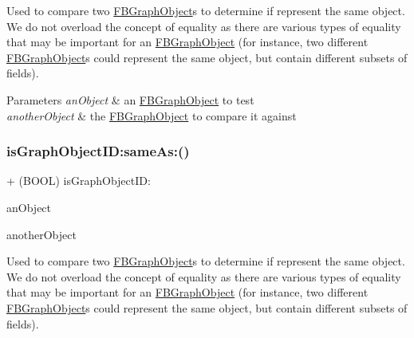 Used to compare two {\ttfamily \hyperlink{interfaceFBGraphObject}{F\+B\+Graph\+Object}}s to determine if represent the same object. We do not overload the concept of equality as there are various types of equality that may be important for an {\ttfamily \hyperlink{interfaceFBGraphObject}{F\+B\+Graph\+Object}} (for instance, two different {\ttfamily \hyperlink{interfaceFBGraphObject}{F\+B\+Graph\+Object}}s could represent the same object, but contain different subsets of fields).


\begin{DoxyParams}{Parameters}
{\em an\+Object} & an {\ttfamily \hyperlink{interfaceFBGraphObject}{F\+B\+Graph\+Object}} to test\\
\hline
{\em another\+Object} & the {\ttfamily \hyperlink{interfaceFBGraphObject}{F\+B\+Graph\+Object}} to compare it against \\
\hline
\end{DoxyParams}
\mbox{\label{interfaceFBGraphObject_a62b9fd3318de27294b10860c9a62160c}} 
\subsubsection{\texorpdfstring{is\+Graph\+Object\+I\+D\+:same\+As\+:()}{isGraphObjectID:sameAs:()}\hspace{0.1cm}{\footnotesize\ttfamily [2/5]}}
{\footnotesize\ttfamily + (B\+O\+OL) is\+Graph\+Object\+I\+D\+: \begin{DoxyParamCaption}\item[{(id$<$ \hyperlink{interfaceFBGraphObject}{F\+B\+Graph\+Object} $>$)}]{an\+Object }\item[{sameAs:(id$<$ \hyperlink{interfaceFBGraphObject}{F\+B\+Graph\+Object} $>$)}]{another\+Object }\end{DoxyParamCaption}}

Used to compare two {\ttfamily \hyperlink{interfaceFBGraphObject}{F\+B\+Graph\+Object}}s to determine if represent the same object. We do not overload the concept of equality as there are various types of equality that may be important for an {\ttfamily \hyperlink{interfaceFBGraphObject}{F\+B\+Graph\+Object}} (for instance, two different {\ttfamily \hyperlink{interfaceFBGraphObject}{F\+B\+Graph\+Object}}s could represent the same object, but contain different subsets of fields).


